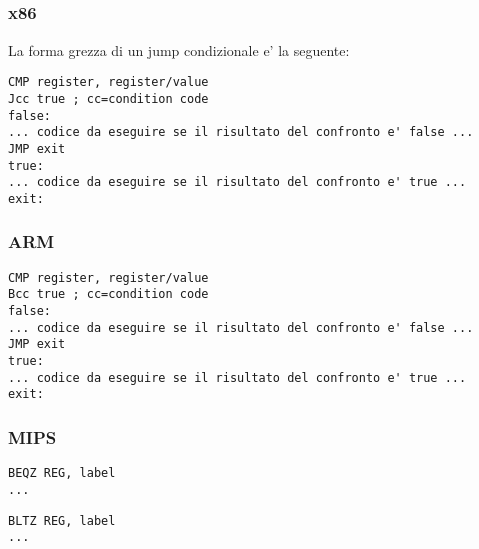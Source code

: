 \label{sec:Jcc}






\subsection{\Conclusion{}}

\subsubsection{x86}

La forma grezza di un jump condizionale e' la seguente:

\begin{lstlisting}[caption=x86,style=customasmx86]
CMP register, register/value
Jcc true ; cc=condition code
false:
... codice da eseguire se il risultato del confronto e' false ...
JMP exit 
true:
... codice da eseguire se il risultato del confronto e' true ...
exit:
\end{lstlisting}

\subsubsection{ARM}

\begin{lstlisting}[caption=ARM,style=customasmARM]
CMP register, register/value
Bcc true ; cc=condition code
false:
... codice da eseguire se il risultato del confronto e' false ...
JMP exit 
true:
... codice da eseguire se il risultato del confronto e' true ...
exit:
\end{lstlisting}

\subsubsection{MIPS}

\begin{lstlisting}[caption=Check for zero,style=customasmMIPS]
BEQZ REG, label
...
\end{lstlisting}

\begin{lstlisting}[caption=Check for less than zero (using pseudoinstruction),style=customasmMIPS]
BLTZ REG, label
...
\end{lstlisting}

